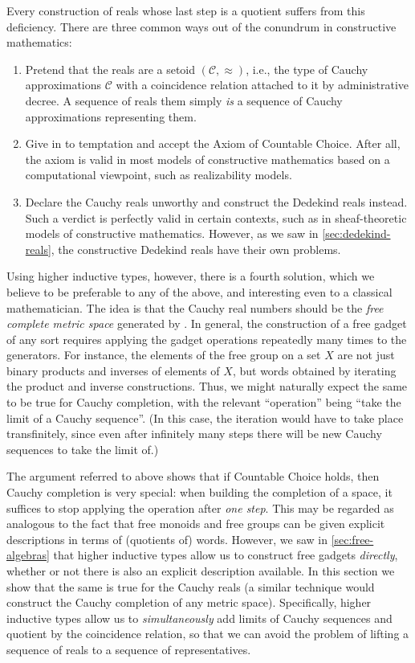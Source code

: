 Every construction of reals whose last step is a quotient suffers from this deficiency.
There are three common ways out of the conundrum in constructive mathematics:
%
\begin{enumerate}
\item Pretend that the reals are a setoid $(\mathcal{C}, {\approx})$, i.e., the type of
  Cauchy approximations $\mathcal{C}$ with a coincidence relation attached to it by
  administrative decree. A sequence of reals them simply \emph{is} a sequence of Cauchy
  approximations representing them.
\item Give in to temptation and accept the Axiom of Countable Choice. After all, the axiom
  is valid in most models of constructive mathematics based on a computational viewpoint,
  such as realizability models.
\item Declare the Cauchy reals unworthy and construct the Dedekind reals instead.
  Such a verdict is perfectly valid in certain contexts, such as in sheaf-theoretic models of constructive mathematics.
  However, as we saw in \autoref{sec:dedekind-reals}, the constructive Dedekind reals have their own problems.
\end{enumerate}

Using higher inductive types, however, there is a fourth solution, which we believe to be preferable to any of the above, and interesting even to a classical mathematician.
The idea is that the Cauchy real numbers should be the \emph{free complete metric space} generated by \Q.
In general, the construction of a free gadget of any sort requires applying the gadget operations repeatedly many times to the generators.
For instance, the elements of the free group on a set $X$ are not just binary products and inverses of elements of $X$, but words obtained by iterating the product and inverse constructions.
Thus, we might naturally expect the same to be true for Cauchy completion, with the relevant ``operation'' being ``take the limit of a Cauchy sequence''.
(In this case, the iteration would have to take place transfinitely, since even after infinitely many steps there will be new Cauchy sequences to take the limit of.)

The argument referred to above shows that if Countable Choice holds, then Cauchy completion is very special: when building the completion of a space, it suffices to stop applying the operation after \emph{one step}.
This may be regarded as analogous to the fact that free monoids and free groups can be given explicit descriptions in terms of (quotients of) words.
However, we saw in \autoref{sec:free-algebras} that higher inductive types allow us to construct free gadgets \emph{directly}, whether or not there is also an explicit description available.
In this section we show that the same is true for the Cauchy reals (a similar technique would construct the Cauchy completion of any metric space).
Specifically, higher inductive types allow us to \emph{simultaneously} add limits of Cauchy sequences and quotient by the coincidence relation, so that we can avoid the problem of lifting a sequence of reals to a sequence of representatives.


